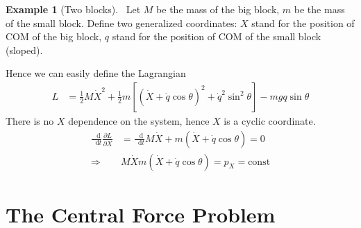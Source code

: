 \documentclass[twoside,11pt]{article}
\numberwithin{equation}{section} %
\newcommand{\lms}{\fontfamily{lmss}\selectfont} %
\renewcommand*\d{\mathop{}\!\mathrm{d}}
\theoremstyle{definition}
\newtheorem{example}{\lms Example}[section]
\theoremstyle{remark}
\begin{document}
\begin{example}[Two blocks]\
Let $M$ be the mass of the big block,
$m$ be the mass of the small block.
Define two generalized coordinates:
$X$ stand for the position of COM of the big block,
$q$ stand for the position of COM of the small block
(sloped). 
\tikzexternalenable
\begin{figure}[H]
    \centering
\end{figure}
\tikzexternaldisable
Hence we can easily define the Lagrangian
\begin{align*}
    L &= 
    \frac{1}{2}M\dot{X}^2
    + \frac{1}{2}m[
        (\dot{X} + \dot{q}\cos\theta)^2
        + \dot{q}^2\sin^2\theta
    ] - mgq\sin\theta
\end{align*}
There is no $X$ dependence on the system, hence
$X$ is a cyclic coordinate.
\begin{align*}
    \frac{\d}{\d t}\frac{\partial L}{\partial\dot{X}}
    &= \frac{\d}{\d t}M\dot{X} + m(\dot{X} + \dot{q}\cos\theta) = 0\\
    \Rightarrow &M\dot{X} m(\dot{X} +\dot{q}\cos\theta) = p_X = \text{const}
\end{align*}
\end{example}



\section{The Central Force Problem}
\end{document}
